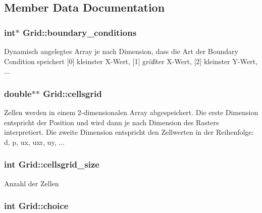\subsection{Member Data Documentation}
\hypertarget{classGrid_a68bd279fd3b1cee412e436b1f3848225}{
\subsubsection[{boundary\-\_\-conditions}]{\setlength{\rightskip}{0pt plus 5cm}int$\ast$ Grid\-::boundary\-\_\-conditions}}\label{classGrid_a68bd279fd3b1cee412e436b1f3848225}
Dynamisch angelegtes Array je nach Dimension, dass die Art der Boundary Condition speichert \mbox{[}0\mbox{]} kleinster X-\/\-Wert, \mbox{[}1\mbox{]} größter X-\/\-Wert, \mbox{[}2\mbox{]} kleinster Y-\/\-Wert, ... \hypertarget{classGrid_aedb9b7d5ce1139730dc73a2f9e0e6edc}{
\subsubsection[{cellsgrid}]{\setlength{\rightskip}{0pt plus 5cm}double$\ast$$\ast$ Grid\-::cellsgrid}}\label{classGrid_aedb9b7d5ce1139730dc73a2f9e0e6edc}
Zellen werden in einem 2-\/dimensionalen Array abgespeichert. Die erste Dimension entspricht der Position und wird dann je nach Dimension des Rasters interpretiert. Die zweite Dimension entspricht den Zellwerten in der Reihenfolge\-: d, p, ux, uxr, uy, ... \hypertarget{classGrid_a2f725f73b6290e8c8527a6566ef07895}{
\subsubsection[{cellsgrid\-\_\-size}]{\setlength{\rightskip}{0pt plus 5cm}int Grid\-::cellsgrid\-\_\-size}}\label{classGrid_a2f725f73b6290e8c8527a6566ef07895}
Anzahl der Zellen \hypertarget{classGrid_af55897b809ffd9733f6723c8a23d89a5}{
\subsubsection[{choice}]{\setlength{\rightskip}{0pt plus 5cm}int Grid\-::choice}}\label{classGrid_af55897b809ffd9733f6723c8a23d89a5}
